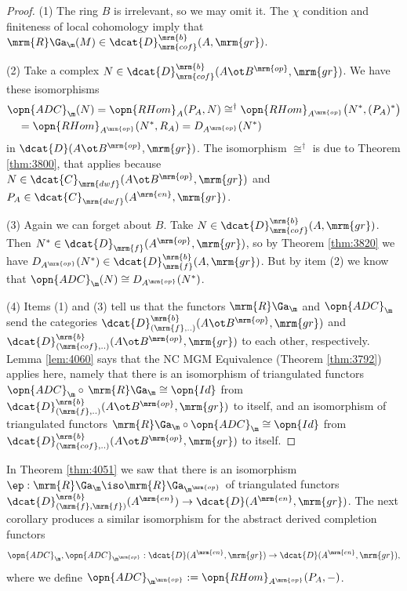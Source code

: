 \begin{proof} \mbox{}

\smallskip \noindent
(1) The ring $B$ is irrelevant, so we may omit it. 
The $\chi$ condition and finiteness of local cohomology imply that 
$\mrm{R} \Ga_{\m}(M) \in \dcat{D}^{\mrm{b}}_{\mrm{cof}}(A, \mrm{gr})$.

\medskip \noindent 
(2) Take a complex 
$N \in \dcat{D}^{\mrm{b}}_{\mrm{cof}}(A \ot B^{\mrm{op}}, \mrm{gr})$.
We have these isomorphisms 
\[ \begin{aligned}
& \opn{ADC}_{\m}(N) = \opn{RHom}_{A}(P_A, N) 
\cong^{\dag} \opn{RHom}_{A^{\mrm{op}}} \bigl( N^*, (P_A)^* \bigr) 
\\ & \quad
= \opn{RHom}_{A^{\mrm{op}}}(N^*, R_A) 
= D_{A^{\mrm{op}}}(N^*) 
\end{aligned} \]
in $\dcat{D}(A\ot B^{\mrm{op}}, \mrm{gr})$.
The isomorphism $\cong^{\dag}$ is due to Theorem \ref{thm:3800}, that applies 
because 
$N \in \dcat{C}_{\mrm{dwf}}(A\ot B^{\mrm{op}}, \mrm{gr})$ and 
$P_A \in \dcat{C}_{\mrm{dwf}}(A^{\mrm{en}}, \mrm{gr})$. 

\medskip \noindent 
(3) Again we can forget about $B$. 
Take $N \in  \dcat{D}^{\mrm{b}}_{\mrm{cof}}(A, \mrm{gr})$.
Then  
$N^* \in \dcat{D}_{\mrm{f}}(A^{\mrm{op}}, \mrm{gr})$,
so by Theorem \ref{thm:3820} we have 
$D_{A^{\mrm{op}}}(N^*) \in \dcat{D}^{\mrm{b}}_{\mrm{f}}(A, \mrm{gr})$.
But by item (2) we know that 
$\opn{ADC}_{\m}(N) \cong D_{A^{\mrm{op}}}(N^*)$. 
            
\medskip \noindent 
(4) Items (1) and (3) tell us that the functors 
$\mrm{R} \Ga_{\m}$ and $\opn{ADC}_{\m}$ send the categories 
$\dcat{D}^{\mrm{b}}_{(\mrm{f}, ..)}(A \ot B^{\mrm{op}}, \mrm{gr})$
and 
$\dcat{D}^{\mrm{b}}_{(\mrm{cof}, ..)}(A \ot B^{\mrm{op}}, \mrm{gr})$
to each other, respectively. 
Lemma \ref{lem:4060} says that the NC MGM Equivalence (Theorem \ref{thm:3792}) 
applies here, namely that there is an isomorphism of triangulated functors 
$\opn{ADC}_{\m} \circ \, \mrm{R} \Ga_{\m} \cong \opn{Id}$
from 
$\dcat{D}^{\mrm{b}}_{(\mrm{f}, ..)}(A \ot B^{\mrm{op}}, \mrm{gr})$
to itself, and an isomorphism of triangulated functors 
$\mrm{R} \Ga_{\m} \circ \opn{ADC}_{\m} \cong \opn{Id}$
from
$\dcat{D}^{\mrm{b}}_{(\mrm{cof}, ..)}(A \ot B^{\mrm{op}}, \mrm{gr})$
to itself.
\end{proof}

In Theorem \ref{thm:4051} we saw that there is an isomorphism 
$\ep : \mrm{R} \Ga_{\m} \iso \mrm{R} \Ga_{\m^{\mrm{op}}}$
of triangulated functors 
$\dcat{D}^{\mrm{b}}_{(\mrm{f}, \mrm{f})}(A^{\mrm{en}}) \to 
\dcat{D}(A^{\mrm{en}}, \mrm{gr})$.
The next corollary produces a similar isomorphism for the abstract derived 
completion functors 
\begin{equation} \label{eqn:4058}
\opn{ADC}_{\m}, \opn{ADC}_{\m^{\mrm{op}}} : \dcat{D}(A^{\mrm{en}}, \mrm{gr}) 
\to 
\dcat{D}(A^{\mrm{en}}, \mrm{gr}) , 
\end{equation}
where we define
$\opn{ADC}_{\m^{\mrm{op}}} := \opn{RHom}_{A^{\mrm{op}}}(P_A, -)$. 

